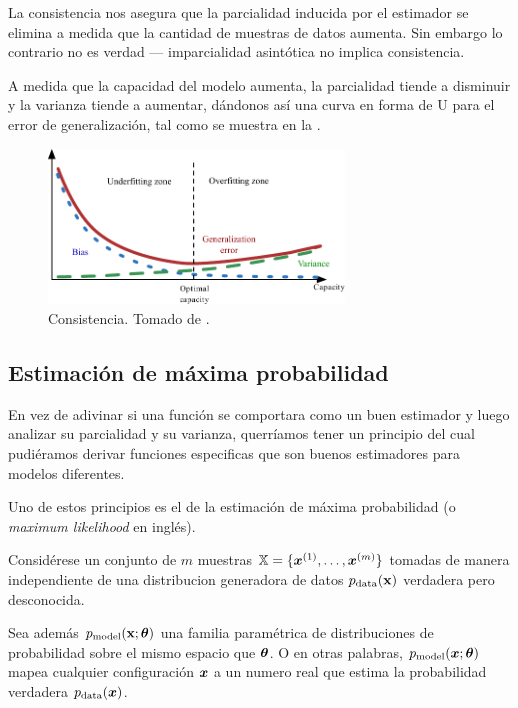 La consistencia nos asegura que la parcialidad inducida por el estimador se elimina a medida que la cantidad de muestras de datos aumenta. Sin embargo lo contrario no es verdad --- imparcialidad asintótica no implica consistencia.

A medida que la capacidad del modelo aumenta, la parcialidad tiende a disminuir y la varianza tiende a aumentar, dándonos así una curva en forma de U para el error de generalización, tal como se muestra en la .

\begin{figure}[H]
  \centering
  \includegraphics[width=0.7\textwidth]{Figures/consistency.pdf}
  \decoRule
  \caption[Consistencia]{Consistencia. Tomado de \cite{deeplearning}.}
  \label{fig:consistency}
\end{figure}


\subsection{Estimación de máxima probabilidad}
En vez de adivinar si una función se comportara como un buen estimador y luego analizar su parcialidad y su varianza, querríamos tener un principio del cual pudiéramos derivar funciones especificas que son buenos estimadores para modelos diferentes.

Uno de estos principios es el de la estimación de máxima probabilidad (o \textsl{maximum likelihood} en inglés).

Considérese un conjunto de $m$ muestras ${\mathbb{X}} = \{ {\bm{x}}^{(1)}, \ldots, {\bm{x}}^{(m)} \}$ tomadas de manera independiente de una distribucion generadora de datos $p_{\rm{data}}({\mathbf{x}})$ verdadera pero desconocida.

Sea además $p_{\rm{model}}({\mathbf{x}}; {\bm{\theta}})$ una familia paramétrica de distribuciones de probabilidad sobre el mismo espacio que ${\bm{\theta}}$. O en otras palabras, $p_{\rm{model}}({\bm{x}}; {\bm{\theta}})$ mapea cualquier configuración ${\bm{x}}$ a un numero real que estima la probabilidad verdadera $p_{\rm{data}}({\bm{x}})$.

